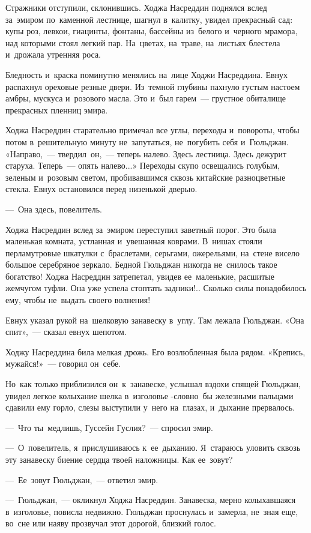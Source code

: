 \documentclass[12pt,a4paper]{book}
\begin{document}
Стражники отступили, склонившись. Ходжа Насреддин поднялся вслед за~эмиром по~каменной лестнице, шагнул в~калитку, увидел прекрасный сад: купы роз, левкои, гиацинты, фонтаны, бассейны из~белого и~черного мрамора, над которыми стоял легкий пар. На~цветах, на~траве, на~листьях блестела и~дрожала утренняя роса.

Бледность и~краска поминутно менялись на~лице Ходжи Насреддина. Евнух распахнул ореховые резные двери. Из~темной глубины пахнуло густым настоем амбры, мускуса и~розового масла. Это и~был гарем~— грустное обиталище прекрасных пленниц эмира.

Ходжа Насреддин старательно примечал все углы, переходы и~повороты, чтобы потом в~решительную минуту не~запутаться, не~погубить себя и~Гюльджан. «Направо,~— твердил~он,~— теперь налево. Здесь лестница. Здесь дежурит старуха. Теперь~— опять налево...» Переходы скупо освещались голубым, зеленым и~розовым светом, пробивавшимся сквозь китайские разноцветные стекла. Евнух остановился перед низенькой дверью.

—~Она здесь, повелитель.

Ходжа Насреддин вслед за~эмиром переступил заветный порог. Это была маленькая комната, устланная и~увешанная коврами. В~нишах стояли перламутровые шкатулки с~браслетами, серьгами, ожерельями, на~стене висело большое серебряное зеркало. Бедной Гюльджан никогда не~снилось такое богатство! Ходжа Насреддин затрепетал, увидев ее~маленькие, расшитые жемчугом туфли. Она уже успела стоптать задники!.. Сколько силы понадобилось ему, чтобы не~выдать своего волнения!

Евнух указал рукой на~шелковую занавеску в~углу. Там лежала Гюльджан. «Она спит»,~— сказал евнух шепотом.

Ходжу Насреддина била мелкая дрожь. Его возлюбленная была рядом. «Крепись, мужайся!»~— говорил он~себе.

Но~как только приблизился он~к~занавеске, услышал вздохи спящей Гюльджан, увидел легкое колыхание шелка в~изголовье -словно~бы железными пальцами сдавили ему горло, слезы выступили у~него на~глазах, и~дыхание прервалось.

—~Что ты~медлишь, Гуссейн Гуслия?~— спросил эмир.

—~О~повелитель, я~прислушиваюсь к~ее~дыханию. Я~стараюсь уловить сквозь эту занавеску биение сердца твоей наложницы. Как ее~зовут?

—~Ее~зовут Гюльджан,~— ответил эмир.

—~Гюльджан,~— окликнул Ходжа Насреддин. Занавеска, мерно колыхавшаяся в~изголовье, повисла недвижно. Гюльджан проснулась и~замерла, не~зная еще, во~сне или наяву прозвучал этот дорогой, близкий голос.
\end{document}
